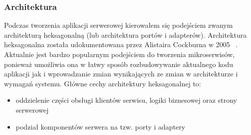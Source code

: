 \subsubsection{Architektura}
Podczas tworzenia aplikacji serwerowej kierowałem się podejściem zwanym architekturą heksagonalną (lub architektura portów i adapterów).
Architektura heksagonalna została udokumentowana przez Alistaira Cockburna w 2005 ~\cite{ref_hex_doc}. Aktualnie jest bardzo popularnym podejściem do tworzenia mikroserwisów, ponieważ umożliwia ona w łatwy sposób rozbudowywanie aktualnego kodu aplikacji jak i wprowadzanie zmian wynikających ze zmian w architekturze i wymagań systemu.
Główne cechy architektury heksagonalnej to:
\begin{itemize}
  \item oddzielenie części obsługi klientów serwisu, logiki biznesowej oraz strony serwerowej
  \item podział komponentów serwera na tzw. porty i adaptery
\end{itemize}
